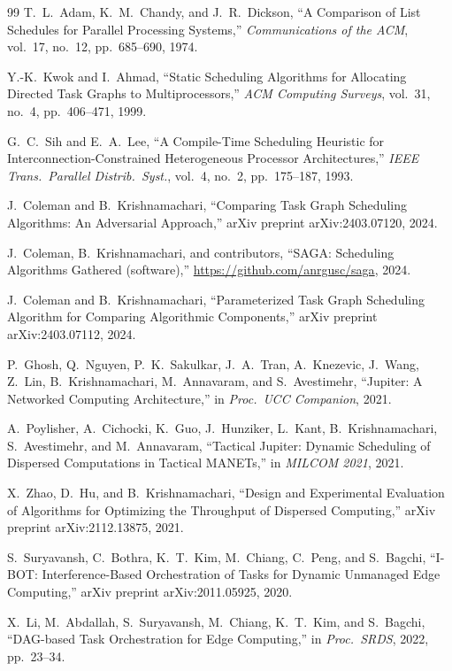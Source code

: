 \documentclass[conference]{IEEEtran}
\begin{document}
\begin{thebibliography}{99}
T.~L.~Adam, K.~M.~Chandy, and J.~R.~Dickson,
``A Comparison of List Schedules for Parallel Processing Systems,''
\emph{Communications of the ACM},
vol.~17, no.~12, pp.~685--690, 1974.

Y.-K.~Kwok and I.~Ahmad,
``Static Scheduling Algorithms for Allocating Directed Task Graphs to
Multiprocessors,''
\emph{ACM Computing Surveys},
vol.~31, no.~4, pp.~406--471, 1999.

G.~C.~Sih and E.~A.~Lee,
``A Compile-Time Scheduling Heuristic for Interconnection-Constrained
Heterogeneous Processor Architectures,''
\emph{IEEE Trans.\ Parallel Distrib.\ Syst.},
vol.~4, no.~2, pp.~175--187, 1993.

J.~Coleman and B.~Krishnamachari,
``Comparing Task Graph Scheduling Algorithms: An Adversarial Approach,''
arXiv preprint arXiv:2403.07120, 2024.

J.~Coleman, B.~Krishnamachari, and contributors,
``{SAGA}: Scheduling Algorithms Gathered (software),''
\url{https://github.com/anrgusc/saga}, 2024.

J.~Coleman and B.~Krishnamachari,
``Parameterized Task Graph Scheduling Algorithm for Comparing Algorithmic
Components,''
arXiv preprint arXiv:2403.07112, 2024.

P.~Ghosh, Q.~Nguyen, P.~K.~Sakulkar, J.~A.~Tran, A.~Knezevic, J.~Wang,
Z.~Lin, B.~Krishnamachari, M.~Annavaram, and S.~Avestimehr,
``Jupiter: A Networked Computing Architecture,''
in \emph{Proc.\ UCC Companion}, 2021.

A.~Poylisher, A.~Cichocki, K.~Guo, J.~Hunziker, L.~Kant,
B.~Krishnamachari, S.~Avestimehr, and M.~Annavaram,
``Tactical Jupiter: Dynamic Scheduling of Dispersed Computations in
Tactical MANETs,''
in \emph{MILCOM 2021}, 2021.

X.~Zhao, D.~Hu, and B.~Krishnamachari,
``Design and Experimental Evaluation of Algorithms for Optimizing the
Throughput of Dispersed Computing,''
arXiv preprint arXiv:2112.13875, 2021.

S.~Suryavansh, C.~Bothra, K.~T.~Kim, M.~Chiang, C.~Peng, and S.~Bagchi,
``{I-BOT}: Interference-Based Orchestration of Tasks for Dynamic Unmanaged
Edge Computing,''
arXiv preprint arXiv:2011.05925, 2020.

X.~Li, M.~Abdallah, S.~Suryavansh, M.~Chiang, K.~T.~Kim, and S.~Bagchi,
``DAG-based Task Orchestration for Edge Computing,''
in \emph{Proc.\ SRDS}, 2022, pp.~23--34.


\end{thebibliography}
\end{document}
